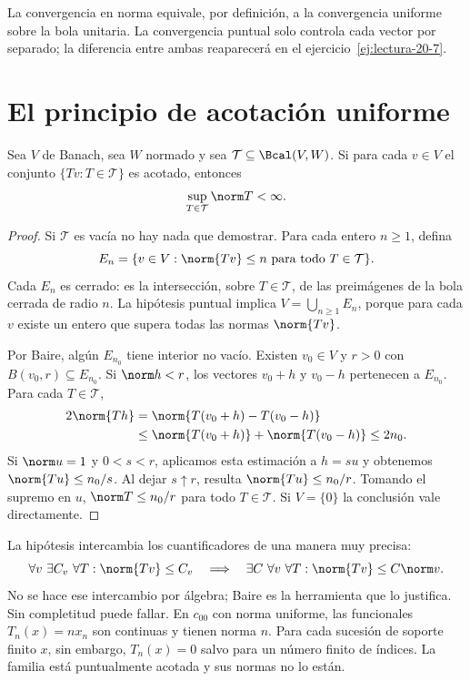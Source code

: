 La convergencia en norma equivale, por definición, a la convergencia uniforme sobre la bola unitaria. La convergencia puntual solo controla cada vector por separado; la diferencia entre ambas reaparecerá en el ejercicio~\ref{ej:lectura-20-7}.

\section{El principio de acotación uniforme}

\begin{teorema}\label{ch20:uniforme}
Sea $V$ de Banach, sea $W$ normado y sea $\mathcal T\subseteq\Bcal(V,W)$. Si para cada $v\in V$ el conjunto $\{Tv:T\in\mathcal T\}$ es acotado, entonces
\[\sup_{T\in\mathcal T}\norm T<\infty.\]
\end{teorema}
\begin{proof}
Si $\mathcal T$ es vacía no hay nada que demostrar. Para cada entero $n\geq1$, defina
\[
 E_n=\{v\in V:\norm{Tv}\leq n\text{ para todo }T\in\mathcal T\}.
\]
Cada $E_n$ es cerrado: es la intersección, sobre $T\in\mathcal T$, de las preimágenes de la bola cerrada de radio $n$. La hipótesis puntual implica $V=\bigcup_{n\geq1}E_n$, porque para cada $v$ existe un entero que supera todas las normas $\norm{Tv}$.

Por Baire, algún $E_{n_0}$ tiene interior no vacío. Existen $v_0\in V$ y $r>0$ con $B(v_0,r)\subseteq E_{n_0}$. Si $\norm h<r$, los vectores $v_0+h$ y $v_0-h$ pertenecen a $E_{n_0}$. Para cada $T\in\mathcal T$,
\begin{align*}
 2\norm{Th}
 &=\norm{T(v_0+h)-T(v_0-h)}\\
 &\leq\norm{T(v_0+h)}+\norm{T(v_0-h)}\leq2n_0.
\end{align*}
Si $\norm u=1$ y $0<s<r$, aplicamos esta estimación a $h=su$ y obtenemos $\norm{Tu}\leq n_0/s$. Al dejar $s\uparrow r$, resulta $\norm{Tu}\leq n_0/r$. Tomando el supremo en $u$, $\norm T\leq n_0/r$ para todo $T\in\mathcal T$. Si $V=\{0\}$ la conclusión vale directamente.
\end{proof}

\begin{observacion}
La hipótesis intercambia los cuantificadores de una manera muy precisa:
\[
 \forall v\ \exists C_v\ \forall T:\norm{Tv}\leq C_v
 \quad\Longrightarrow\quad
 \exists C\ \forall v\ \forall T:\norm{Tv}\leq C\norm v.
\]
No se hace ese intercambio por álgebra; Baire es la herramienta que lo justifica. Sin completitud puede fallar. En $c_{00}$ con norma uniforme, las funcionales $T_n(x)=nx_n$ son continuas y tienen norma $n$. Para cada sucesión de soporte finito $x$, sin embargo, $T_n(x)=0$ salvo para un número finito de índices. La familia está puntualmente acotada y sus normas no lo están.
\end{observacion}

